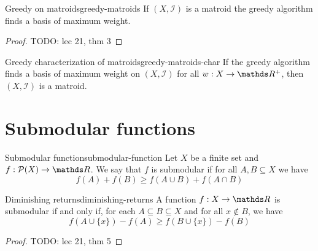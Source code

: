 \documentclass[12pt]{extarticle}
\begin{document}
\begin{theorem}{Greedy on matroids}{greedy-matroids}
	If $(X, \mathcal I)$ is a matroid the greedy algorithm finds a basis of maximum weight.
\end{theorem}

\begin{proof}
	TODO: lec 21, thm 3
\end{proof}

\begin{proposition}{Greedy characterization of matroids}{greedy-matroids-char}
	If the greedy algorithm finds a basis of maximum weight on $(X, \mathcal I)$ for all
	$w: X \to \R^+$, then $(X, \mathcal I)$ is a matroid.
\end{proposition}

\section{Submodular functions}
\begin{definition}{Submodular function}{submodular-function}
	Let $X$ be a finite set and $f: \mathcal P(X) \to \R$.
	We say that $f$ is submodular if for all $A, B \subseteq X$ we have
	\begin{equation}
		f(A) + f(B) \geq f(A \cup B) + f(A \cap B)
	\end{equation}
\end{definition}

\begin{proposition}{Diminishing returns}{diminishing-returns}
	A function $f: X \to \R$ is submodular if and only if, for each $A \subseteq B \subseteq X$ and
	for all $x \notin B$, we have
	\begin{equation}
		f(A \cup \{x\}) - f(A) \geq f(B \cup \{ x\}) - f(B)
	\end{equation}
\end{proposition}

\begin{proof}
	TODO: lec 21, thm 5
\end{proof}
\end{document}
